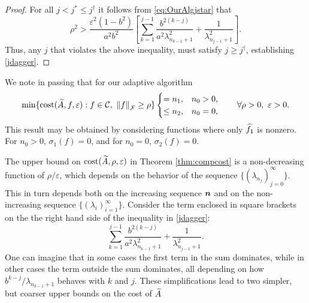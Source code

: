 \documentclass[final]{elsarticle}
\theoremstyle{definition}
\theoremstyle{remark}
\begin{document}
\begin{proof}
For all $j < j^* \le j^\dagger$ it follows from \eqref{eq:OurAlgjstar} that
\begin{equation*}
\rho^2 > \frac{\varepsilon^2(1 - b^2)}{a^2b^2} \left[ \sum_{k=1}^{j-1} \frac{ b^{2(k-j)}}{a^{2}\lambda_{n_{k-1}+1}^2} + \frac{1}{\lambda_{n_{j-1}+1}^2}\right].
\end{equation*}
Thus, any $j$ that violates the above inequality, must satisfy $j \ge j^\dagger$, establishing \eqref{jdagger}.
\end{proof}

We note in passing that for our adaptive algorithm
\begin{equation*}
 \min \{\cost(\tA,f,\varepsilon) : f \in \cc, \ \norm[\cf]{f} \ge \rho \} 
 \begin{cases} = n_1, & n_0 > 0, \\
 \le n_2, & n_0 = 0, 
 \end{cases}
 \qquad \forall \rho > 0, \ \varepsilon > 0.
\end{equation*}
This result may be obtained by considering functions where only $\widehat{f}_1$ is nonzero.  For $n_0 > 0$, $\sigma_1(f) = 0$, and for $n_0 = 0$, $\sigma_2(f) = 0$.

The upper bound on $\operatorname{cost}(\widetilde{A},\rho,\varepsilon)$ in Theorem \ref{thm:compcost}  is a non-decreasing function of $\rho/\varepsilon$, which depends on the behavior of the sequence $\{(\lambda_{n_j})_{j=0}^\infty\}$.  This in turn depends both on the increasing sequence $\boldsymbol{n}$ and on the non-increasing sequence $\{(\lambda_i)_{i=1}^\infty\}$. Consider the  term enclosed in square brackets on the the right hand side of the inequality in \eqref{jdagger}: \begin{equation} \label{keysum}
\sum_{k=1}^{j-1} \frac{b^{2(k-j)}}{a^2\lambda_{n_{k-1}+1}^2} + \frac{1}{\lambda_{n_{j-1}+1}^2}.
\end{equation}
One can imagine that in some cases the first term in the sum dominates, while in other cases the term outside the sum dominates, all depending on how $b^{k-j}/\lambda_{n_{k-1}+1}$ behaves with $k$ and $j$.  These simplifications lead to two simpler, but coarser upper bounds on the cost of $\widetilde{A}$
\end{document}
